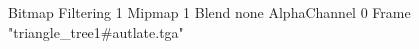{Bitmap
	{Filtering 1}
	{Mipmap 1}
	{Blend none}
	{AlphaChannel 0}
	{Frame "triangle_tree1#autlate.tga"}
}
